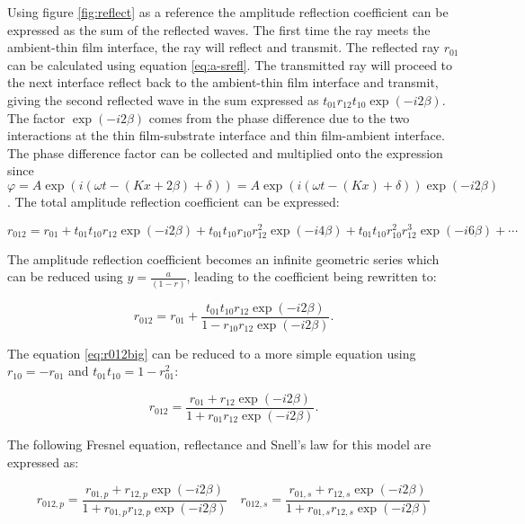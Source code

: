\documentclass[MasterThesisMain.tex]{subfiles}
\begin{document}
Using figure \ref{fig:reflect} as a reference the amplitude reflection coefficient can be expressed as the sum of the reflected waves. The first time the ray meets the ambient-thin film interface, the ray will reflect and transmit. The reflected ray $r_{01}$ can be calculated using equation \ref{eq:a-srefl}. The transmitted ray will proceed to the next interface reflect back to the ambient-thin film interface and transmit, giving the second reflected wave in the sum expressed as $t_{01}r_{12}t_{10}\exp(-i2\beta)$. The factor $\exp(-i2\beta)$ comes from the phase difference due to the two interactions at the thin film-substrate interface and thin film-ambient interface. The phase difference factor can be collected and multiplied onto the expression since  $\varphi = A\exp(i(\omega t-(Kx+2\beta)+\delta))=A\exp(i(\omega t-(Kx)+\delta))\exp(-i2\beta)$. The total amplitude reflection coefficient can be expressed:

\begin{equation}
r_{012} = r_{01} + t_{01}t_{10}r_{12}\exp(-i2\beta) + t_{01}t_{10}r_{10}r_{12}^2\exp(-i4\beta)+ t_{01}t_{10}r_{10}^2r_{12}^3\exp(-i6\beta)+ \cdots
\end{equation}  

The amplitude reflection coefficient becomes an infinite geometric series which can be reduced using $y=\frac{a}{(1-r)}$, leading to the coefficient being rewritten to:

\begin{equation} \label{eq:r012big}
r_{012}=r_{01}+\frac{t_{01}t_{10}r_{12}\exp(-i2\beta)}{1-r_{10}r_{12}\exp(-i2\beta)}.
\end{equation}

The equation \ref{eq:r012big} can be reduced to a more simple equation using $r_{10}=-r_{01}$ and $t_{01}t_{10}=1-r_{01}^2$:

\begin{equation}\label{eq:2layerreflect}
r_{012}= \frac{r_{01}+r_{12}\exp(-i2\beta)}{1+r_{01}r_{12}\exp(-i2\beta)}.
\end{equation} 

The following Fresnel equation, reflectance and Snell's law for this model are expressed as:

\begin{equation}
r_{012,p} = \frac{r_{01,p}+r_{12,p}\exp(-i2\beta)}{1+r_{01,p}r_{12,p}\exp(-i2\beta)} \quad r_{012,s}= \frac{r_{01,s}+r_{12,s}\exp(-i2\beta)}{1+r_{01,s}r_{12,s}\exp(-i2\beta)}
\end{equation}
\end{document}
